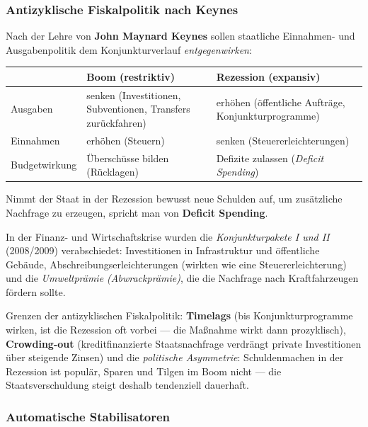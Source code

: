 \documentclass[11pt, a4paper]{article}
\begin{document}
\subsubsection{Antizyklische Fiskalpolitik nach Keynes}

Nach der Lehre von \textbf{John Maynard Keynes} sollen staatliche Einnahmen- und
Ausgabenpolitik dem Konjunkturverlauf \emph{entgegenwirken}:

\begin{center}
\begin{tabular}{p{3.2cm} p{5.2cm} p{5.2cm}}
\toprule
 & \textbf{Boom (restriktiv)} & \textbf{Rezession (expansiv)}\\
\midrule
Ausgaben & senken (Investitionen, Subventionen, Transfers zurückfahren) & erhöhen (öffentliche Aufträge, Konjunkturprogramme)\\
Einnahmen & erhöhen (Steuern) & senken (Steuererleichterungen)\\
Budgetwirkung & Überschüsse bilden (Rücklagen) & Defizite zulassen (\emph{Deficit Spending})\\
\bottomrule
\end{tabular}
\end{center}

Nimmt der Staat in der Rezession bewusst neue Schulden auf, um zusätzliche Nachfrage zu
erzeugen, spricht man von \textbf{Deficit Spending}.

\begin{beispiel}
In der Finanz- und Wirtschaftskrise wurden die \emph{Konjunkturpakete I und II} (2008/2009)
verabschiedet: Investitionen in Infrastruktur und öffentliche Gebäude,
Abschreibungserleichterungen (wirkten wie eine Steuererleichterung) und die
\emph{Umweltprämie (Abwrackprämie)}, die die Nachfrage nach Kraftfahrzeugen fördern sollte.
\end{beispiel}

\begin{achtung}
Grenzen der antizyklischen Fiskalpolitik: \textbf{Timelags} (bis Konjunkturprogramme
wirken, ist die Rezession oft vorbei --- die Maßnahme wirkt dann prozyklisch),
\textbf{Crowding-out} (kreditfinanzierte Staatsnachfrage verdrängt private Investitionen
über steigende Zinsen) und die \emph{politische Asymmetrie}: Schuldenmachen in der
Rezession ist populär, Sparen und Tilgen im Boom nicht --- die Staatsverschuldung steigt
deshalb tendenziell dauerhaft.
\end{achtung}

\subsubsection{Automatische Stabilisatoren}
\end{document}

